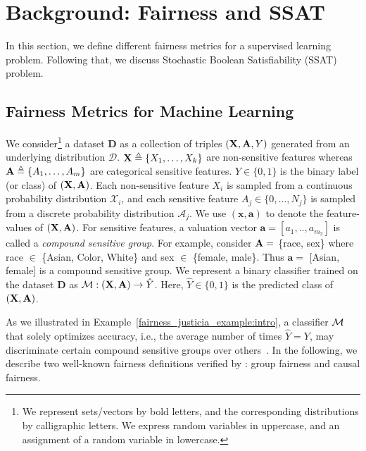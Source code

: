 \section{Background: Fairness and SSAT}
\label{fairness_justicia_sec:preliminaries}

In this section, we define different fairness metrics for a supervised learning problem. Following that, we discuss Stochastic Boolean Satisfiability (SSAT) problem.

\subsection{Fairness Metrics for Machine Learning}\label{fairness_justicia_sec:fairness}


We consider\footnote{{We represent sets/vectors by bold letters, and the corresponding distributions by calligraphic letters. We express random variables in uppercase, and an assignment of a random variable in lowercase.}} a dataset $ \mathbf{D} $ as a collection of triples $ (\mathbf{X}, \mathbf{A}, Y) $ generated from an underlying distribution $\mathcal{D}$. $ \mathbf{X} \triangleq \{X_1, \dots, X_{k}\} $ are non-sensitive features whereas $ \mathbf{A} \triangleq \{A_1, \dots, A_{m}\} $ are categorical sensitive features.  $Y \in \{0,1\}$ is the binary label (or class) of $(\mathbf{X},\mathbf{A})$. Each non-sensitive feature $ X_i$ is sampled from a continuous probability distribution {$ \mathcal{X}_i $}, and each sensitive feature $ A_j \in \{0, \dots, N_j\}  $ is sampled from a discrete probability distribution {$ \mathcal{A}_j $}. We use $ (\mathbf{x}, \mathbf{a}) $ to denote the feature-values of  $ (\mathbf{X}, \mathbf{A}) $.  For sensitive features, a valuation vector $ \mathbf{a} = [a_1, .., a_{m_2}] $ is called a \textit{compound sensitive group}. For example, consider $ \mathbf{A} = $ \{race, sex\} where race $ \in $ \{Asian, Color, White\} and sex $ \in $ \{female, male\}. Thus $ \mathbf{a} = $ [Asian, female]  is a compound sensitive group. 
We represent a binary classifier trained on the dataset $\mathbf{D}$ as $\mathcal{M}: (\mathbf{X}, \mathbf{A}) \rightarrow \hat{Y} $. Here, $\hat{Y} \in \{0,1\}$ is the predicted class of $ (\mathbf{X}, \mathbf{A}) $.



As we illustrated in Example~\ref{fairness_justicia_example:intro}, a classifier $\mathcal{M}$ that solely optimizes accuracy, i.e., the average number of times $\hat{Y} = Y$, may discriminate certain compound sensitive groups over others~\cite{chouldechova2020snapshot}. In the following, we describe two well-known fairness definitions verified by {\justicia}: group fairness and causal fairness. 


